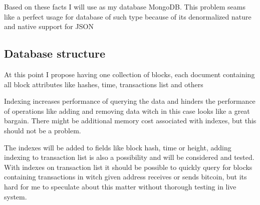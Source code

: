 \documentclass{article}
\begin{document}
Based on these facts I will use as my database MongoDB. This problem seams like a perfect usage for database of such type because of its denormalized nature and native support for JSON
 \subsection{Database structure}
 
 At this point I propose having one collection of blocks, each document containing all block attributes like hashes, time, transactions list and others
 
Indexing increases performance of querying the data and hinders the performance of operations like adding and removing data witch in this case looks like a great bargain. There might be additional memory cost associated with indexes, but this should not be a problem.

The indexes will be added to fields like block hash, time or height, adding indexing to transaction list is also a possibility and will be considered and tested. With indexes on transaction list it should be possible to quickly query for blocks containing transactions in witch given address receives or sends bitcoin, but its hard for me to speculate about this matter without thorough testing in live system.
\end{document}
